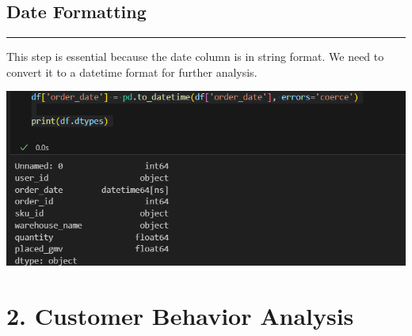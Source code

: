 \documentclass{article}
\begin{document}
    \subsection{Date Formatting}
    \begin{center}
        \color{green}\rule{1\linewidth}{0.7mm}
    \end{center}
    This step is essential because the date column is in string format. We need to convert it to a datetime format for further analysis.{
        \begin{center}
            \includegraphics[width=1\columnwidth]{images/datatype.png}
        \end{center}
    }



\section{2. Customer Behavior Analysis}
\end{document}
